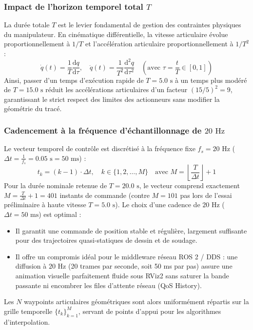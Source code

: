 \documentclass[11pt,a4paper]{report}
\begin{document}
\subsubsection{Impact de l'horizon temporel total $T$}
La durée totale $T$ est le levier fondamental de gestion des contraintes physiques du manipulateur. En cinématique différentielle, la vitesse articulaire évolue proportionnellement à $1/T$ et l'accélération articulaire proportionnellement à $1/T^2$ :
\begin{equation}
    \dot{q}(t) = \frac{1}{T} \frac{\mathrm{d}q}{\mathrm{d}\tau}, \quad \ddot{q}(t) = \frac{1}{T^2} \frac{\mathrm{d}^2 q}{\mathrm{d}\tau^2} \quad \left(\text{avec } \tau = \frac{t}{T} \in [0, 1]\right)
\end{equation}
Ainsi, passer d'un temps d'exécution rapide de $T = 5.0\text{ s}$ à un temps plus modéré de $T = 15.0\text{ s}$ réduit les accélérations articulaires d'un facteur $(15/5)^2 = 9$, garantissant le strict respect des limites des actionneurs sans modifier la géométrie du tracé.

\subsubsection{Cadencement à la fréquence d'échantillonnage de $20\text{ Hz}$}
Le vecteur temporel de contrôle est discrétisé à la fréquence fixe $f_s = 20\text{ Hz}$ ($\Delta t = \frac{1}{f_s} = 0.05\text{ s} = 50\text{ ms}$) :
\begin{equation}
    t_k = (k - 1) \cdot \Delta t, \quad k \in \{1, 2, \dots, M\} \quad \text{avec } M = \left\lfloor \frac{T}{\Delta t} \right\rfloor + 1
\end{equation}
Pour la durée nominale retenue de $T = 20.0\text{ s}$, le vecteur comprend exactement $M = \frac{T}{\Delta t} + 1 = 401$ instants de commande (contre $M = 101$ pas lors de l'essai préliminaire à haute vitesse $T = 5.0\text{ s}$). Le choix d'une cadence de $20\text{ Hz}$ ($\Delta t = 50\text{ ms}$) est optimal :
\begin{itemize}
    \item Il garantit une commande de position stable et régulière, largement suffisante pour des trajectoires quasi-statiques de dessin et de soudage.
    \item Il offre un compromis idéal pour le middleware réseau ROS 2 / DDS : une diffusion à $20\text{ Hz}$ (20 trames par seconde, soit 50 ms par pas) assure une animation visuelle parfaitement fluide sous RViz2 sans saturer la bande passante ni encombrer les files d'attente réseau (QoS History).
\end{itemize}
Les $N$ waypoints articulaires géométriques sont alors uniformément répartis sur la grille temporelle $\{t_k\}_{k=1}^M$, servant de points d'appui pour les algorithmes d'interpolation.
\end{document}
